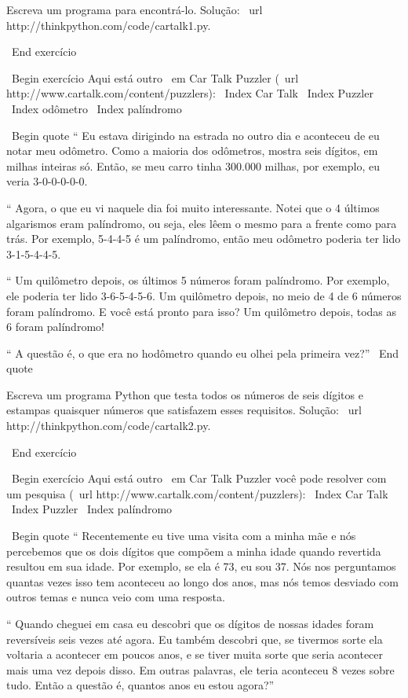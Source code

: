 \documentclass[10pt]{book}
\begin{document}
\begin {itemize}
{{{{{{Escreva um programa para encontrá-lo. Solução: \ url {http://thinkpython.com/code/cartalk1.py}.

\ End {} exercício


\ Begin {} exercício
Aqui está outro {\ em Car Talk}
Puzzler (\ url {http://www.cartalk.com/content/puzzlers}):
\ Index {Car Talk}
\ Index {} Puzzler
\ Index {} odômetro
\ Index {palíndromo}

\ Begin {quote}
`` Eu estava dirigindo na estrada no outro dia e aconteceu de eu
notar meu odômetro. Como a maioria dos odômetros, mostra seis dígitos,
em milhas inteiras só. Então, se meu carro tinha 300.000
milhas, por exemplo, eu veria 3-0-0-0-0-0.

`` Agora, o que eu vi naquele dia foi muito interessante. Notei que o
4 últimos algarismos eram palíndromo, ou seja, eles lêem o mesmo para a frente como
para trás. Por exemplo, 5-4-4-5 é um palíndromo, então meu odômetro
poderia ter lido 3-1-5-4-4-5.

`` Um quilômetro depois, os últimos 5 números foram palíndromo. Por exemplo, ele
poderia ter lido 3-6-5-4-5-6. Um quilômetro depois, no meio de 4 de
6 números foram palíndromo. E você está pronto para isso? Um quilômetro depois,
todas as 6 foram palíndromo!

`` A questão é, o que era no hodômetro quando eu olhei pela primeira vez?''
\ End {quote}

Escreva um programa Python que testa todos os números de seis dígitos e estampas
quaisquer números que satisfazem esses requisitos.  
Solução: \ url {http://thinkpython.com/code/cartalk2.py}.

\ End {} exercício


\ Begin {} exercício
Aqui está outro {\ em Car Talk} Puzzler você pode resolver com um
pesquisa (\ url {http://www.cartalk.com/content/puzzlers}):
\ Index {Car Talk}
\ Index {} Puzzler
\ Index {palíndromo}

\ Begin {quote}
`` Recentemente eu tive uma visita com a minha mãe e nós percebemos que
os dois dígitos que compõem a minha idade quando revertida resultou em sua
idade. Por exemplo, se ela é 73, eu sou 37. Nós nos perguntamos quantas vezes isso tem
aconteceu ao longo dos anos, mas nós temos desviado com outros temas e
nunca veio com uma resposta.

`` Quando cheguei em casa eu descobri que os dígitos de nossas idades foram
reversíveis seis vezes até agora. Eu também descobri que, se tivermos sorte ela
voltaria a acontecer em poucos anos, e se tiver muita sorte que seria
acontecer mais uma vez depois disso. Em outras palavras, ele teria
aconteceu 8 vezes sobre tudo. Então a questão é, quantos anos eu estou agora?''

}}}}}}
\end{itemize}
\end{document}
